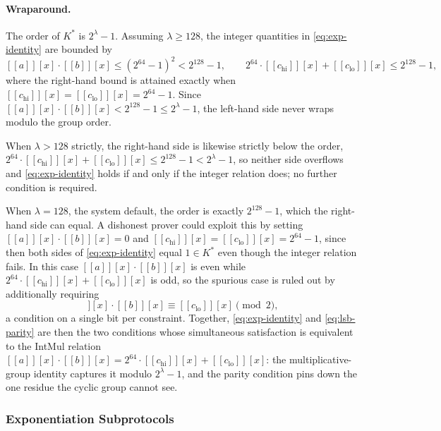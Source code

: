 \documentclass{article}
\theoremstyle{definition}
\newcommand{\intval}[1]{[\![#1]\!]}
\begin{document}
\paragraph{Wraparound.}
The order of $K^*$ is $2^\lambda - 1$. Assuming $\lambda \geq 128$, the integer quantities in \eqref{eq:exp-identity} are bounded by
\[
  \intval{a}[x] \cdot \intval{b}[x] \leq (2^{64} - 1)^2 < 2^{128} - 1, \qquad 2^{64} \cdot \intval{c_\text{hi}}[x] + \intval{c_\text{lo}}[x] \leq 2^{128} - 1,
\]
where the right-hand bound is attained exactly when $\intval{c_\text{hi}}[x] = \intval{c_\text{lo}}[x] = 2^{64} - 1$. Since $\intval{a}[x] \cdot \intval{b}[x] < 2^{128} - 1 \leq 2^\lambda - 1$, the left-hand side never wraps modulo the group order.

When $\lambda > 128$ strictly, the right-hand side is likewise strictly below the order, $2^{64} \cdot \intval{c_\text{hi}}[x] + \intval{c_\text{lo}}[x] \leq 2^{128} - 1 < 2^\lambda - 1$, so neither side overflows and \eqref{eq:exp-identity} holds if and only if the integer relation does; no further condition is required.

When $\lambda = 128$, the system default, the order is exactly $2^{128} - 1$, which the right-hand side can equal. A dishonest prover could exploit this by setting $\intval{a}[x] \cdot \intval{b}[x] = 0$ and $\intval{c_\text{hi}}[x] = \intval{c_\text{lo}}[x] = 2^{64} - 1$, since then both sides of \eqref{eq:exp-identity} equal $1 \in K^*$ even though the integer relation fails. In this case $\intval{a}[x] \cdot \intval{b}[x]$ is even while $2^{64} \cdot \intval{c_\text{hi}}[x] + \intval{c_\text{lo}}[x]$ is odd, so the spurious case is ruled out by additionally requiring
\begin{equation}
  \intval{a}[x] \cdot \intval{b}[x] \equiv \intval{c_\text{lo}}[x] \pmod 2,
  \label{eq:lsb-parity}
\end{equation}
a condition on a single bit per constraint. Together, \eqref{eq:exp-identity} and \eqref{eq:lsb-parity} are then the two conditions whose simultaneous satisfaction is equivalent to the IntMul relation $\intval{a}[x] \cdot \intval{b}[x] = 2^{64} \cdot \intval{c_\text{hi}}[x] + \intval{c_\text{lo}}[x]$: the multiplicative-group identity captures it modulo $2^\lambda - 1$, and the parity condition pins down the one residue the cyclic group cannot see.

\subsubsection{Exponentiation Subprotocols}
\label{sec:exp-subprotocols}
\end{document}
